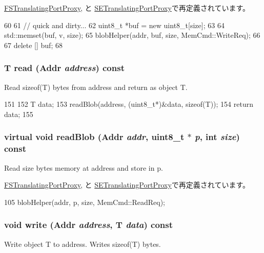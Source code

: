 \hyperlink{classFSTranslatingPortProxy_aaaf1f49b0b6f48f1af72af03caf7fef7}{FSTranslatingPortProxy}, と \hyperlink{classSETranslatingPortProxy_ab8c719f72992ac0e0b2b9a2c464a1456}{SETranslatingPortProxy}で再定義されています。


\begin{DoxyCode}
60 {
61     // quick and dirty...
62     uint8_t *buf = new uint8_t[size];
63 
64     std::memset(buf, v, size);
65     blobHelper(addr, buf, size, MemCmd::WriteReq);
66 
67     delete [] buf;
68 }
\end{DoxyCode}
\hypertarget{classPortProxy_adf1f83afbd5cc115dfb7b36d85c6c0f4}{
\subsubsection[{read}]{\setlength{\rightskip}{0pt plus 5cm}T read ({\bf Addr} {\em address}) const}}
\label{classPortProxy_adf1f83afbd5cc115dfb7b36d85c6c0f4}
Read sizeof(T) bytes from address and return as object T. 


\begin{DoxyCode}
151 {
152     T data;
153     readBlob(address, (uint8_t*)&data, sizeof(T));
154     return data;
155 }
\end{DoxyCode}
\hypertarget{classPortProxy_ad63586ad1fa7fd707ea7e03665c25502}{
\subsubsection[{readBlob}]{\setlength{\rightskip}{0pt plus 5cm}virtual void readBlob ({\bf Addr} {\em addr}, \/  uint8\_\-t $\ast$ {\em p}, \/  int {\em size}) const}}
\label{classPortProxy_ad63586ad1fa7fd707ea7e03665c25502}
Read size bytes memory at address and store in p. 

\hyperlink{classFSTranslatingPortProxy_a5580fe869fe8ffcffe2660eaa2c6276a}{FSTranslatingPortProxy}, と \hyperlink{classSETranslatingPortProxy_a5580fe869fe8ffcffe2660eaa2c6276a}{SETranslatingPortProxy}で再定義されています。


\begin{DoxyCode}
105     { blobHelper(addr, p, size, MemCmd::ReadReq); }
\end{DoxyCode}
\hypertarget{classPortProxy_ab308283d9164c7743ad1cb192a3f2e14}{
\subsubsection[{write}]{\setlength{\rightskip}{0pt plus 5cm}void write ({\bf Addr} {\em address}, \/  T {\em data}) const}}
\label{classPortProxy_ab308283d9164c7743ad1cb192a3f2e14}
Write object T to address. Writes sizeof(T) bytes. 


